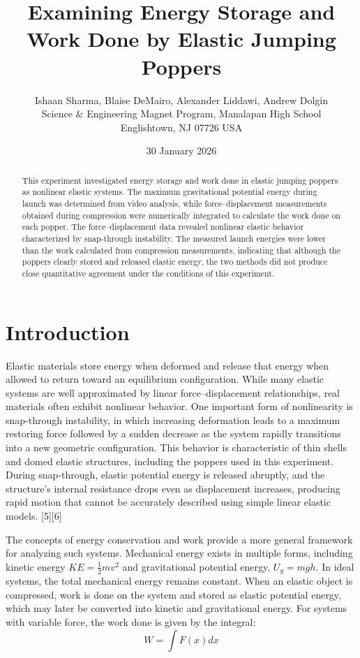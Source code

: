 \documentclass[12pt]{article}
\title{\textbf{Examining Energy Storage and Work Done by Elastic Jumping Poppers}}
\author{Ishaan Sharma, Blaise DeMairo, Alexander Liddawi, Andrew Dolgin \\
\small Science \& Engineering Magnet Program, Manalapan High School \\
\small Englishtown, NJ 07726 USA}
\date{30 January 2026}
\begin{document}
\maketitle

\begin{abstract}
This experiment investigated energy storage and work done in elastic jumping poppers as nonlinear elastic systems. The maximum gravitational potential energy during launch was determined from video analysis, while force--displacement measurements obtained during compression were numerically integrated to calculate the work done on each popper. The force--displacement data revealed nonlinear elastic behavior characterized by snap-through instability. The measured launch energies were lower than the work calculated from compression measurements, indicating that although the poppers clearly stored and released elastic energy, the two methods did not produce close quantitative agreement under the conditions of this experiment.
\end{abstract}

\section{Introduction}
Elastic materials store energy when deformed and release that energy when allowed to return toward an equilibrium configuration. While many elastic systems are well approximated by linear force--displacement relationships, real materials often exhibit nonlinear behavior. One important form of nonlinearity is snap-through instability, in which increasing deformation leads to a maximum restoring force followed by a sudden decrease as the system rapidly transitions into a new geometric configuration. This behavior is characteristic of thin shells and domed elastic structures, including the poppers used in this experiment. During snap-through, elastic potential energy is released abruptly, and the structure’s internal resistance drops even as displacement increases, producing rapid motion that cannot be accurately described using simple linear elastic models. [5][6]

The concepts of energy conservation and work provide a more general framework for analyzing such systems. Mechanical energy exists in multiple forms, including kinetic energy $KE = \frac{1}{2}mv^2$ and gravitational potential energy, $U_g = mgh$. In ideal systems, the total mechanical energy remains constant. When an elastic object is compressed, work is done on the system and stored as elastic potential energy, which may later be converted into kinetic and gravitational energy. For systems with variable force, the work done is given by the integral:
$$W = \int F(x)dx$$
\end{document}
